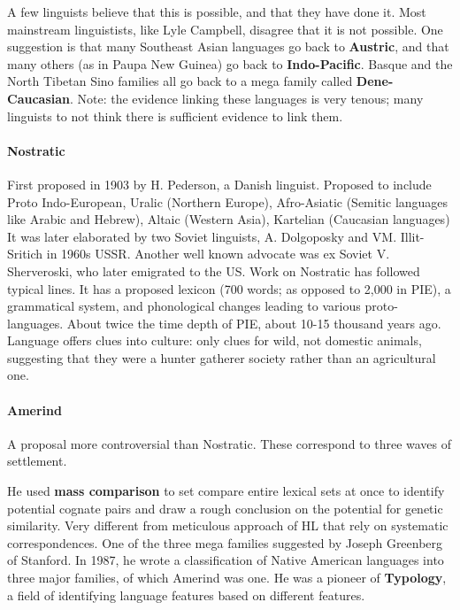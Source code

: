 \documentclass{exam}
\begin{document}
A few linguists believe that this is possible, and that they have done it. 
Most mainstream linguistists, like Lyle Campbell, disagree that it is not possible.
One suggestion is that many Southeast Asian languages go back to \textbf{Austric}, and that many others (as in Paupa New Guinea) go back to \textbf{Indo-Pacific}. 
Basque and the North Tibetan Sino families all go back to a mega family called \textbf{Dene-Caucasian}. 
Note: the evidence linking these languages is very tenous; many linguists to not think there is sufficient evidence to link them. 


\paragraph{Nostratic}First proposed in 1903 by H. Pederson, a Danish linguist. 
Proposed to include Proto Indo-European, Uralic (Northern Europe), Afro-Asiatic (Semitic languages like Arabic and Hebrew), Altaic (Western Asia), Kartelian (Caucasian languages)
It was later elaborated by two Soviet linguists, A. Dolgoposky and VM. Illit-Sritich in 1960s USSR. 
Another well known advocate was ex Soviet V. Sherveroski, who later emigrated to the US. 
Work on Nostratic has followed typical lines. 
It has a proposed lexicon (700 words; as opposed to 2,000 in PIE), a grammatical system, and phonological changes leading to various proto-languages. 
About twice the time depth of PIE, about 10-15 thousand years ago. 
Language offers clues into culture: only clues for wild, not domestic animals, suggesting that they were a hunter gatherer society rather than an agricultural one.  

\paragraph{Amerind}A proposal more controversial than Nostratic. These correspond to three waves of settlement. 

He used \textbf{mass comparison} to set compare entire lexical sets at once to identify potential cognate pairs and draw a rough conclusion on the potential for genetic similarity. 
Very different from meticulous approach of HL that rely on systematic correspondences. 
One of the three mega families suggested by Joseph Greenberg of Stanford. 
In 1987, he wrote a classification of Native American languages into three major families, of which Amerind was one. 
He was a pioneer of \textbf{Typology}, a field of identifying language features based on different features. 
\end{document}
